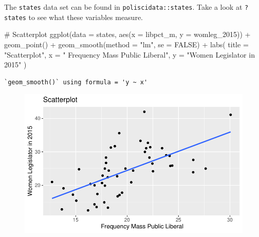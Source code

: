 \documentclass[
  letterpaper,
  DIV=11,
  numbers=noendperiod]{scrartcl}
\newenvironment{Shaded}{\begin{snugshade}}{\end{snugshade}}
\newcommand{\AttributeTok}[1]{\textcolor[rgb]{0.40,0.45,0.13}{#1}}
\newcommand{\CommentTok}[1]{\textcolor[rgb]{0.37,0.37,0.37}{#1}}
\newcommand{\ConstantTok}[1]{\textcolor[rgb]{0.56,0.35,0.01}{#1}}
\newcommand{\FunctionTok}[1]{\textcolor[rgb]{0.28,0.35,0.67}{#1}}
\newcommand{\NormalTok}[1]{\textcolor[rgb]{0.00,0.23,0.31}{#1}}
\newcommand{\SpecialCharTok}[1]{\textcolor[rgb]{0.37,0.37,0.37}{#1}}
\newcommand{\StringTok}[1]{\textcolor[rgb]{0.13,0.47,0.30}{#1}}
\begin{document}
\begin{tcolorbox}[enhanced jigsaw, opacitybacktitle=0.6, bottomtitle=1mm, coltitle=black, colback=white, colframe=quarto-callout-note-color-frame, toprule=.15mm, leftrule=.75mm, breakable, left=2mm, bottomrule=.15mm, toptitle=1mm, arc=.35mm, titlerule=0mm, title=\textcolor{quarto-callout-note-color}{\faInfo}\hspace{0.5em}{Note}, opacityback=0, colbacktitle=quarto-callout-note-color!10!white, rightrule=.15mm]

The \texttt{states} data set can be found in
\texttt{poliscidata::states}. Take a look at \texttt{?states} to see
what these variables measure.

\end{tcolorbox}

\begin{Shaded}
\begin{Highlighting}[]
\CommentTok{\# Scatterplot }
\FunctionTok{ggplot}\NormalTok{(}\AttributeTok{data =}\NormalTok{ states, }\FunctionTok{aes}\NormalTok{(}\AttributeTok{x =}\NormalTok{ libpct\_m, }\AttributeTok{y =}\NormalTok{ womleg\_2015)) }\SpecialCharTok{+}
  \FunctionTok{geom\_point}\NormalTok{() }\SpecialCharTok{+}
  \FunctionTok{geom\_smooth}\NormalTok{(}\AttributeTok{method =} \StringTok{"lm"}\NormalTok{, }\AttributeTok{se =} \ConstantTok{FALSE}\NormalTok{) }\SpecialCharTok{+}
  \FunctionTok{labs}\NormalTok{(}
    \AttributeTok{title =} \StringTok{"Scatterplot"}\NormalTok{,}
    \AttributeTok{x =} \StringTok{" Frequency Mass Public Liberal"}\NormalTok{,}
    \AttributeTok{y =} \StringTok{"Women Legislator in 2015"}
\NormalTok{  )}
\end{Highlighting}
\end{Shaded}

\begin{verbatim}
`geom_smooth()` using formula = 'y ~ x'
\end{verbatim}

\begin{figure}[H]

{\centering \includegraphics{problem_set_2_completed2_files/figure-pdf/unnamed-chunk-2-1.pdf}

}

\end{figure}
\end{document}

